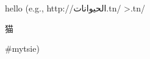 \documentclass[a4paper,10pt]{article}
\begin{document}
hello
(e.g., http://\<الحيوانات.tn/ >.tn/\begin{CJK*}{UTF8}{gbsn}猫
\end{CJK*}\#mytsie)
\end{document}
